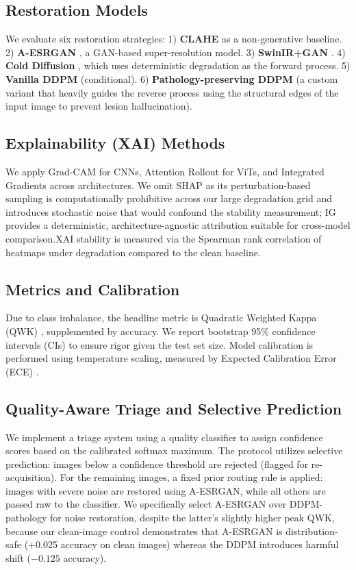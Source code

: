 \documentclass[runningheads]{llncs}
\begin{document}
\subsection{Restoration Models}
We evaluate six restoration strategies:
1) \textbf{CLAHE} \cite{pizer1987clahe} as a non-generative baseline.
2) \textbf{A-ESRGAN} \cite{wei2021aesrgan}, a GAN-based super-resolution model.
3) \textbf{SwinIR+GAN} \cite{liang2021swinir}.
4) \textbf{Cold Diffusion} \cite{bansal2022colddiffusion}, which uses deterministic degradation as the forward process.
5) \textbf{Vanilla DDPM} \cite{ho2020ddpm} (conditional).
6) \textbf{Pathology-preserving DDPM} (a custom variant that heavily guides the reverse process using the structural edges of the input image to prevent lesion hallucination).

\subsection{Explainability (XAI) Methods}
We apply Grad-CAM \cite{selvaraju2017gradcam} for CNNs, Attention Rollout \cite{abnar2020rollout} for ViTs, and Integrated Gradients \cite{sundararajan2017ig} across architectures. We omit SHAP as its perturbation-based sampling is computationally prohibitive across our large degradation grid and introduces stochastic noise that would confound the stability measurement; IG provides a deterministic, architecture-agnostic attribution suitable for cross-model comparison.XAI stability is measured via the Spearman rank correlation of heatmaps under degradation compared to the clean baseline.

\subsection{Metrics and Calibration}
Due to class imbalance, the headline metric is Quadratic Weighted Kappa (QWK) \cite{cohen1968kappa}, supplemented by accuracy. We report bootstrap 95\% confidence intervals (CIs) to ensure rigor given the test set size. Model calibration is performed using temperature scaling, measured by Expected Calibration Error (ECE) \cite{guo2017calibration}.

\subsection{Quality-Aware Triage and Selective Prediction}
We implement a triage system using a quality classifier to assign confidence scores based on the calibrated softmax maximum. The protocol utilizes selective prediction: images below a confidence threshold are rejected (flagged for re-acquisition). For the remaining images, a fixed prior routing rule is applied: images with severe noise are restored using A-ESRGAN, while all others are passed raw to the classifier. We specifically select A-ESRGAN over DDPM-pathology for noise restoration, despite the latter's slightly higher peak QWK, because our clean-image control demonstrates that A-ESRGAN is distribution-safe (+0.025 accuracy on clean images) whereas the DDPM introduces harmful shift ($-0.125$ accuracy).
\end{document}
